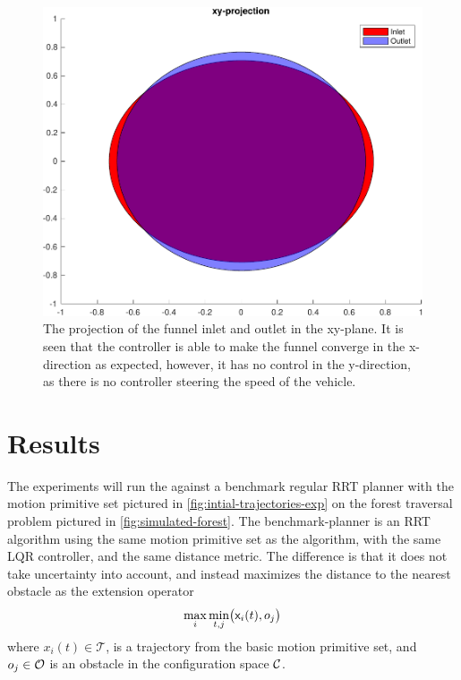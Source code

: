 \begin{figure}
  \centering
  \includegraphics[width=.8\textwidth]{figures/experiments/funnel-inlet-outlet}
  \caption{The projection of the funnel inlet and outlet in the xy-plane. It is
    seen that the controller is able to make the funnel converge in the
    x-direction as expected, however, it has no control in the y-direction, as
    there is no controller steering the speed of the vehicle.}
  \label{fig:funnel-inlet-outlet}
\end{figure}

\section{Results}
\label{sec:experiments-final}

The experiments will run the \rrtfunnel{} against a benchmark regular RRT
planner with the motion primitive set pictured in
\cref{fig:intial-trajectories-exp} on the forest traversal problem pictured in
\cref{fig:simulated-forest}. The benchmark-planner is an \ac{RRT} algorithm
using the same motion primitive set as the \rrtfunnel{} algorithm, with the same
\ac{LQR} controller, and the same distance metric. The difference is that it
does not take uncertainty into account, and instead maximizes the distance to
the nearest obstacle as the extension operator \ie{}
\begin{equation}
  \max_{i}\min_{t,j} \bigl( {\mathbf{\mathsf{x}}}_{i}(t), o_{j} \bigr)
\end{equation}
where \(x_{i}(t) \in \mathcal{T}\), is a trajectory from the basic motion
primitive set, and \(o_{j} \in \mathcal{O}{}\) is an obstacle in the
configuration space \(\mathcal{C}{}\).

